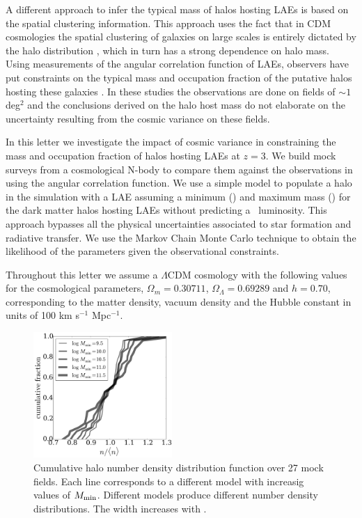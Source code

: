 \documentclass{emulateapj}
\newcommand{\ly}{{\ifmmode{{\rm Ly}\alpha}\else{Ly$\alpha$}\fi}}
\newcommand{\mmin}{{\ifmmode{{M_{\rm min}}}\else{${M_{\rm min}}$}\fi}}
\newcommand{\mmax}{{\ifmmode{{M_{\rm max}}}\else{${M_{\rm max}}$}\fi}}
\begin{document}
A different approach to infer the typical mass of halos hosting
LAEs is based on the spatial clustering information. 
This approach uses the fact
that in CDM cosmologies the spatial clustering of galaxies on large
scales is entirely dictated by the halo distribution
\citep{Colberg00}, which in turn has a strong dependence on halo
mass. 
Using measurements of the angular correlation function of LAEs,
observers have put constraints on the typical mass and occupation
fraction of the putative halos hosting these galaxies
\citep{Hayashino2004,Gawiser07,Nilsson2007,Ouchi2010,Bielby16}. 
In these studies the observations are done on fields of $\sim 1$ deg$^{2}$ and
the conclusions derived on the halo host mass do not elaborate on the
uncertainty resulting from the cosmic variance on these fields. 

In this letter we investigate the impact of cosmic variance in
constraining the mass and occupation fraction of halos hosting LAEs at $z=3$.
We build mock surveys from a cosmological N-body to compare them
against the observations in \cite{Bielby16} using the angular
correlation function.  
We use a simple model to populate a halo in the simulation with a LAE   
assuming a minimum (\mmin) and maximum mass (\mmax) for the dark
matter halos hosting LAEs without predicting a \ly\  luminosity.  
This approach bypasses all the physical uncertainties associated to
star formation and radiative transfer. 
We use the Markov Chain Monte Carlo technique to obtain the likelihood
of the parameters given the observational constraints. 

Throughout this letter we assume a $\Lambda$CDM cosmology with the
following values for the cosmological parameters, $\Omega_{m}=0.30711$,
$\Omega_{\Lambda}=0.69289$ and $h=0.70$, corresponding to the matter
density, vacuum density and the Hubble constant in units of 100 km
s$^{-1}$ Mpc$^{-1}$. 


\begin{figure}
\includegraphics[width=0.47\textwidth]{fig1.pdf}
\caption{Cumulative halo number density distribution function over
  27 mock fields. Each line corresponds to a
  different model with increasig values of $M_{\rm min}$. 
  Different models produce different number density distributions. The
width increases with \mmin. } 
\label{fig:cosmicv0}
\end{figure}
\end{document}
